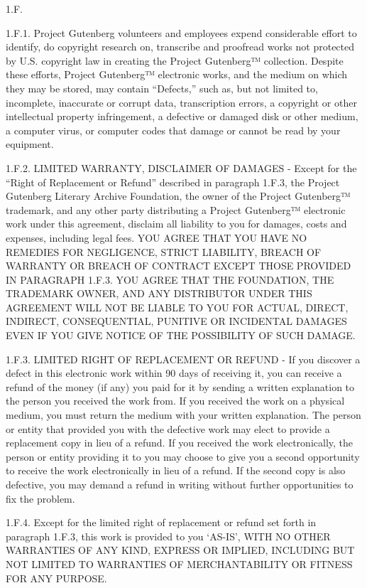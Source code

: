 1.F.

1.F.1. Project Gutenberg volunteers and employees expend considerable
effort to identify, do copyright research on, transcribe and proofread
works not protected by U.S. copyright law in creating the Project
Gutenberg™ collection. Despite these efforts, Project Gutenberg™
electronic works, and the medium on which they may be stored, may
contain ``Defects,'' such as, but not limited to, incomplete, inaccurate
or corrupt data, transcription errors, a copyright or other intellectual
property infringement, a defective or damaged disk or other medium, a
computer virus, or computer codes that damage or cannot be read by your
equipment.

1.F.2. LIMITED WARRANTY, DISCLAIMER OF DAMAGES - Except for the ``Right
of Replacement or Refund'' described in paragraph 1.F.3, the Project
Gutenberg Literary Archive Foundation, the owner of the Project
Gutenberg™ trademark, and any other party distributing a Project
Gutenberg™ electronic work under this agreement, disclaim all liability
to you for damages, costs and expenses, including legal fees. YOU AGREE
THAT YOU HAVE NO REMEDIES FOR NEGLIGENCE, STRICT LIABILITY, BREACH OF
WARRANTY OR BREACH OF CONTRACT EXCEPT THOSE PROVIDED IN PARAGRAPH 1.F.3.
YOU AGREE THAT THE FOUNDATION, THE TRADEMARK OWNER, AND ANY DISTRIBUTOR
UNDER THIS AGREEMENT WILL NOT BE LIABLE TO YOU FOR ACTUAL, DIRECT,
INDIRECT, CONSEQUENTIAL, PUNITIVE OR INCIDENTAL DAMAGES EVEN IF YOU GIVE
NOTICE OF THE POSSIBILITY OF SUCH DAMAGE.

1.F.3. LIMITED RIGHT OF REPLACEMENT OR REFUND - If you discover a defect
in this electronic work within 90 days of receiving it, you can receive
a refund of the money (if any) you paid for it by sending a written
explanation to the person you received the work from. If you received
the work on a physical medium, you must return the medium with your
written explanation. The person or entity that provided you with the
defective work may elect to provide a replacement copy in lieu of a
refund. If you received the work electronically, the person or entity
providing it to you may choose to give you a second opportunity to
receive the work electronically in lieu of a refund. If the second copy
is also defective, you may demand a refund in writing without further
opportunities to fix the problem.

1.F.4. Except for the limited right of replacement or refund set forth
in paragraph 1.F.3, this work is provided to you `AS-IS', WITH NO OTHER
WARRANTIES OF ANY KIND, EXPRESS OR IMPLIED, INCLUDING BUT NOT LIMITED TO
WARRANTIES OF MERCHANTABILITY OR FITNESS FOR ANY PURPOSE.

